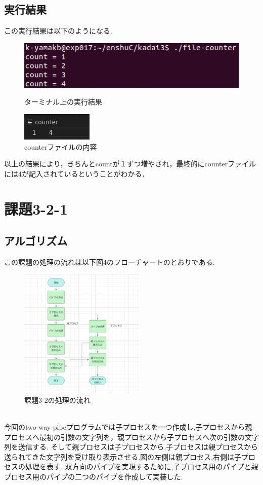 \documentclass[dvipdfmx]{jarticle}
\begin{document}
\subsection{実行結果}
この実行結果は以下のようになる.
\begin{figure}[htbp]
    \begin{minipage}[b]{0.45\linewidth}
      \centering
      \includegraphics[keepaspectratio, scale=0.7]{result3-1.png}
      \caption{ターミナル上の実行結果}
    \end{minipage}
    \begin{minipage}[b]{0.45\linewidth}
      \centering
      \includegraphics[keepaspectratio, scale=0.8]{result3-1-1.png}
      \caption{counterファイルの内容}
    \end{minipage}
  \end{figure}
  以上の結果により，きちんとcountが１ずつ増やされ，最終的にcounterファイルには4が記入されているということがわかる．


  \section{課題3-2-1}
\subsection{アルゴリズム}
この課題の処理の流れは以下図4のフローチャートのとおりである.
\begin{figure}[h]
    \centering
    \includegraphics[width=6cm]{3-2hurotya.png}
    \caption{課題3-2の処理の流れ}
\end{figure}
\\
今回のtwo-way-pipeプログラムでは子プロセスを一つ作成し,子プロセスから親プロセスへ最初の引数の文字列を，親プロセスから子プロセスへ次の引数の文字列を送信する.
そして親プロセスは子プロセスから,子プロセスは親プロセスから送られてきた文字列を受け取り表示させる.図の左側は親プロセス,右側は子プロセスの処理を表す.
双方向のパイプを実現するために,子プロセス用のパイプと親プロセス用のパイプの二つのパイプを作成して実装した.
\end{document}
